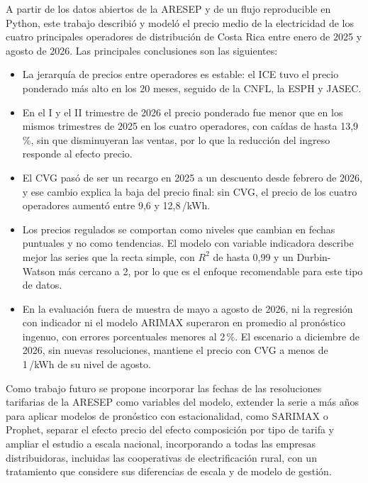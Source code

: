 \documentclass[conference]{IEEEtran}
\newcommand{\crc}{\textcolonmonetary} %
\begin{document}
A partir de los datos abiertos de la ARESEP y de un flujo reproducible en Python, este trabajo describi\'o y model\'o el precio medio de la electricidad de los cuatro principales operadores de distribuci\'on de Costa Rica entre enero de 2025 y agosto de 2026. Las principales conclusiones son las siguientes:
\begin{itemize}
\item La jerarqu\'ia de precios entre operadores es estable: el ICE tuvo el precio ponderado m\'as alto en los 20 meses, seguido de la CNFL, la ESPH y JASEC.
\item En el I y el II trimestre de 2026 el precio ponderado fue menor que en los mismos trimestres de 2025 en los cuatro operadores, con ca\'idas de hasta 13,9\,\%, sin que disminuyeran las ventas, por lo que la reducci\'on del ingreso responde al efecto precio.
\item El CVG pas\'o de ser un recargo en 2025 a un descuento desde febrero de 2026, y ese cambio explica la baja del precio final: sin CVG, el precio de los cuatro operadores aument\'o entre 9,6 y 12,8\,\crc/kWh.
\item Los precios regulados se comportan como niveles que cambian en fechas puntuales y no como tendencias. El modelo con variable indicadora describe mejor las series que la recta simple, con $R^2$ de hasta 0,99 y un Durbin-Watson m\'as cercano a 2, por lo que es el enfoque recomendable para este tipo de datos.

\item En la evaluaci\'on fuera de muestra de mayo a agosto de 2026, ni la regresi\'on con indicador ni el modelo ARIMAX superaron en promedio al pron\'ostico ingenuo, con errores porcentuales menores al 2\,\%. El escenario a diciembre de 2026, sin nuevas resoluciones, mantiene el precio con CVG a menos de 1\,\crc/kWh de su nivel de agosto.

\end{itemize}

Como trabajo futuro se propone incorporar las fechas de las resoluciones tarifarias de la ARESEP como variables del modelo, extender la serie a m\'as a\~nos para aplicar modelos de pron\'ostico con estacionalidad, como SARIMAX o Prophet, separar el efecto precio del efecto composici\'on por tipo de tarifa y ampliar el estudio a escala nacional, incorporando a todas las empresas distribuidoras, incluidas las cooperativas de electrificaci\'on rural, con un tratamiento que considere sus diferencias de escala y de modelo de gesti\'on.
\end{document}
